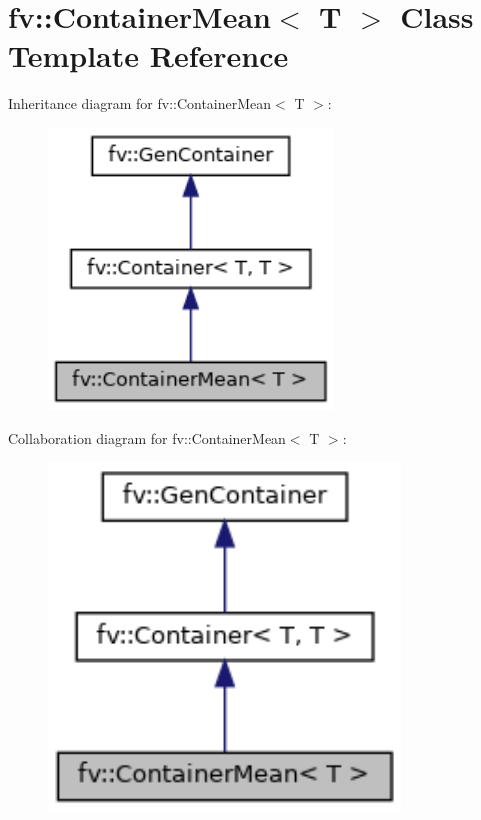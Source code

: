 \hypertarget{classfv_1_1ContainerMean}{}\section{fv\+:\+:Container\+Mean$<$ T $>$ Class Template Reference}
\label{classfv_1_1ContainerMean}


Inheritance diagram for fv\+:\+:Container\+Mean$<$ T $>$\+:
\nopagebreak
\begin{figure}[H]
\begin{center}
\leavevmode
\includegraphics[width=214pt]{classfv_1_1ContainerMean__inherit__graph}
\end{center}
\end{figure}


Collaboration diagram for fv\+:\+:Container\+Mean$<$ T $>$\+:
\nopagebreak
\begin{figure}[H]
\begin{center}
\leavevmode
\includegraphics[width=265pt]{classfv_1_1ContainerMean__coll__graph}
\end{center}
\end{figure}
